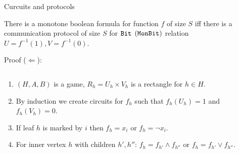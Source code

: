 \begin{frame}{Curcuits and protocols}

    \begin{theorem}[S 2016, unp.] 
        There is a monotone boolean formula for function $f$ of size $S$ iff there is a communication protocol of size $S$
        for $\mathtt{Bit}$ $(\mathtt{MonBit})$ relation $U = f^{-1}(1), V = f^{-1}(0)$.
    \end{theorem}
    
    \pause
    Proof ($\Leftarrow$):
    \begin{columns}[t]
		\begin{column}{0.65\textwidth}
            \vspace{-5mm}
            \begin{enumerate}
                \item<3-> $(H, A, B)$ is a game, $R_h = U_h \times V_h$ is a rectangle for $h \in H$.
                \item<4-> By induction we create circuits for $f_h$ such that $f_h(U_h) = 1$ and $f_h(V_h) = 0$.
                \item<5-> If leaf $h$ is marked by $i$ then $f_h = x_i$ or $f_h = \neg x_i$.
                \item<6-> For inner vertex $h$ with children $h', h''$: $f_h = f_{h'} \land f_{h''}$ or $f_h = f_{h'} \lor
                    f_{h''}$.
            \end{enumerate}
        \end{column}
        
		\begin{column}{0.35\textwidth}
		\end{column}
	\end{columns}
\end{frame}


